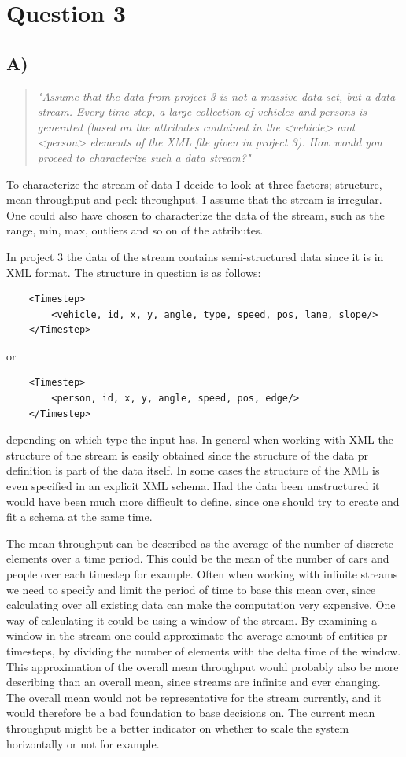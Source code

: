 	\section{Question 3}
	
	\subsection{A)}
	\begin{quote}
		\textit{"Assume	that	the	data	from	project	3	is	not	a	massive	data	set,	but	a	data	stream.	Every	time	step,	a	large	collection	of	vehicles	and	persons	is	generated	(based	on	the	attributes	contained	in	the	<vehicle>	and	<person>	elements	of	the	XML	file	given	in	project	3).	How	would	you	proceed	to	characterize	such	a	data	stream?"}
	\end{quote}
	To characterize the stream of data I decide to look at three factors; structure, mean throughput and peek throughput. I assume that the stream is irregular. One could also have chosen to characterize the data of the stream, such as the range, min, max, outliers and so on of the attributes.
	
	\newpar In project 3 the data of the stream contains semi-structured data since it is in XML format. The structure in question is as follows:
	\begin{verbatim}
	<Timestep>
	    <vehicle, id, x, y, angle, type, speed, pos, lane, slope/>
	</Timestep>
	\end{verbatim}
	or 
	\begin{verbatim}
	<Timestep>
	    <person, id, x, y, angle, speed, pos, edge/>
	</Timestep>
	\end{verbatim}
	depending on which type the input has. In general when working with XML the structure of the stream is easily obtained since the structure of the data pr definition is part of the data itself. In some cases the structure of the XML is even specified in an explicit XML schema. Had the data been unstructured it would have been much more difficult to define, since one should try to create and fit a schema at the same time.
	
	\newpar The mean throughput can be described as the average of the number of discrete elements over a time period. This could be the mean of the number of cars and people over each timestep for example. Often when working with infinite streams we need to specify and limit the period of time to base this mean over, since calculating over all existing data can make the computation very expensive. One way of calculating it could be using a window of the stream. By examining a window in the stream one could approximate the average amount of entities pr timesteps, by dividing the number of elements with the delta time of the window. This approximation of the overall mean throughput would probably also be more describing than an overall mean, since streams are infinite and ever changing. The overall mean would not be representative for the stream currently, and it would therefore be a bad foundation to base decisions on. The current mean throughput might be a better indicator on whether to scale the system horizontally or not for example.
	
